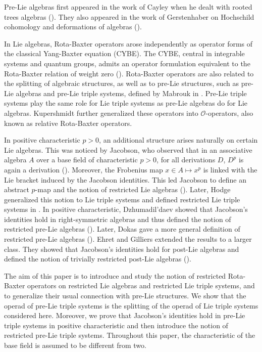 \documentclass[11pt, twoside]{article}
\begin{document}
Pre-Lie algebras first appeared in the work of Cayley when he dealt with rooted trees algebras (\cite{C57}). They also appeared in the work of Gerstenhaber on Hochschild cohomology and deformations of algebras (\cite{G63}).

In Lie algebras, Rota-Baxter operators arose independently as operator forms of the classical Yang-Baxter equation (CYBE). The CYBE, central in integrable systems and quantum groups, admits an operator formulation equivalent to the Rota-Baxter relation of weight zero (\cite{STS83}). Rota-Baxter operators are also related to the splitting of algebraic structures, as well as to pre-Lie structures, such as pre-Lie algebras and pre-Lie triple systems, defined by Mabrouk in \cite{M21}. Pre-Lie triple systems play the same role for Lie triple systems as pre-Lie algebras do for Lie algebras. Kupershmidt further generalized these operators into $\mathcal{O}$-operators, also known as relative Rota-Baxter operators. 

In positive characteristic $p>0$, an additional structure arises naturally on certain Lie algebras. This was noticed by Jacobson, who observed that in an associative algebra $A$ over a base field of characteristic $p>0$, for all derivations $D$, $D^p$ is again a derivation (\cite{J37}). Moreover, the Frobenius map $x\in A\mapsto x^p$ is linked with the Lie bracket induced by the Jacobson identities. This led Jacobson to define an abstract $p$-map and the notion of restricted Lie algebras (\cite{J41}). Later, Hodge generalized this notion to Lie triple systems and defined restricted Lie triple systems in \cite{H01}.
In positive characteristic, Dzhumadil'daev showed that Jacobson's identities hold in right-symmetric algebras and thus defined the notion of restricted pre-Lie algebras (\cite{D01}). Later, Dokas gave a more general definition of restricted pre-Lie algebras (\cite{D12}). Ehret and Gilliers extended the results to a larger class. They showed that Jacobson's identities hold for post-Lie algebras and defined the notion of trivially restricted post-Lie algebras (\cite{EG25}).

The aim of this paper is to introduce and study  the notion of restricted Rota-Baxter operators on restricted Lie algebras and restricted Lie triple systems, and to generalize their usual connection with pre-Lie structures. We show that the operad of pre-Lie triple systems is the splitting of the operad of Lie triple systems considered here. Moreover, we prove that Jacobson's identities hold in pre-Lie triple systems in positive characteristic and then introduce the notion of restricted pre-Lie triple systems. Throughout this paper, the characteristic of the base field is assumed to be different from two. 
\end{document}
